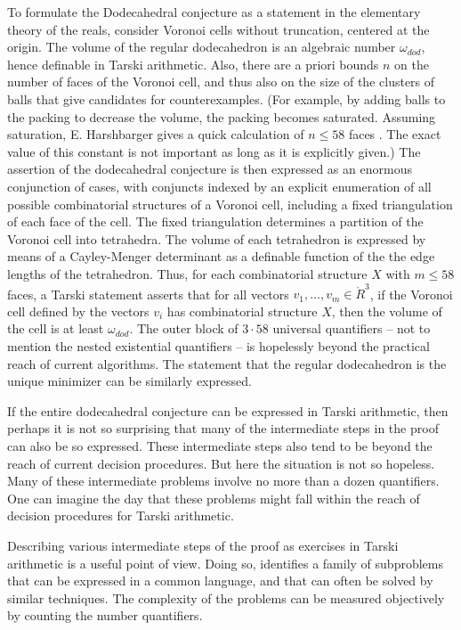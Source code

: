 To formulate the Dodecahedral conjecture as a statement in the
elementary theory of the reals, consider Voronoi cells without
truncation, centered at the origin.  The
volume of the regular dodecahedron is an algebraic number $\omega_{dod}$,
hence definable in Tarski arithmetic.  Also, there are
a priori bounds $n$ on the number of faces of the Voronoi cell, and thus also
on the size of the clusters of balls that give candidates for counterexamples. (For example, by adding balls to the packing to decrease the volume, 
the  packing becomes saturated.  Assuming saturation, E. Harshbarger gives a quick calculation of $n\le58$ faces \cite{Har}. The exact value of this constant is not important as long as it is explicitly given.)
The assertion of the dodecahedral conjecture is then expressed as an enormous conjunction
of cases, with conjuncts indexed by an explicit enumeration of all possible combinatorial structures of a Voronoi cell, including a fixed triangulation of each face of the cell.  The fixed triangulation determines
a partition of the Voronoi cell into tetrahedra.  The volume of each tetrahedron is expressed by means of a Cayley-Menger determinant as a definable function of the the edge lengths of the tetrahedron.  Thus, for each combinatorial structure $X$ with $m\le 58$ faces, a Tarski statement asserts that
for all vectors $v_1,\ldots,v_m\in\ring{R}^3$, if the Voronoi cell defined by the vectors $v_i$ has combinatorial structure $X$, then the volume of the cell is at least $\omega_{dod}$.  The outer block of $3\cdot 58$ universal quantifiers -- not to mention the nested existential quantifiers -- is hopelessly beyond the practical reach of current algorithms.  The statement that the regular dodecahedron is the unique minimizer can be similarly expressed.

If the entire dodecahedral conjecture can be expressed
in Tarski arithmetic, then perhaps it is not so surprising that
many of the intermediate steps in the proof can also be so expressed.
These intermediate steps also tend to be beyond the reach of
current decision procedures.  
But here the situation is not so hopeless.  Many of these
intermediate problems involve no more than a dozen quantifiers.
One can imagine the day that these problems might fall within the
reach of decision procedures for Tarski arithmetic.

Describing various intermediate steps 
of the proof as exercises
in Tarski arithmetic is a useful point of view.  Doing so, identifies
a family of subproblems that can be expressed in a common language,
and that can often be solved by similar techniques.  
The complexity of the
problems can be measured objectively by counting the number
quantifiers.

